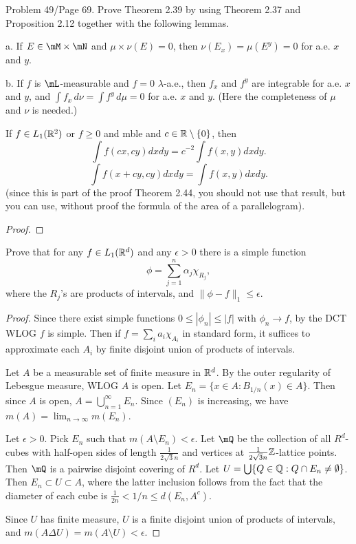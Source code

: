 \documentclass{article}
\begin{document}
 Problem 49/Page 69. Prove Theorem 2.39 by using Theorem 2.37 and Proposition 2.12 together with the following lemmas.

a. If $E \in \mM \times \mN$ and $\mu \times \nu(E) = 0$, then $\nu(E_x) = \mu(E^y) = 0$ for a.e. $x$ and $y$.

b. If $f$ is $\mL$-measurable and $f = 0$ $\lambda$-a.e., then $f_x$ and $f^y$ are integrable for a.e. $x$ and $y$, and $\int f_x \, d\nu = \int f^y \, d\mu = 0$ for a.e. $x$ and $y$. (Here the completeness of $\mu$ and $\nu$ is needed.)

 If $f \in L_1(\mathbb{R}^2)$ or $f \ge 0$ and mble and $c \in \mathbb{R} \setminus \{0\}$, then
$$ \int f (cx, cy) dx dy  =  c^{-2} \int f(x,y) dx dy.$$
$$\int f (x + cy, cy) dx dy  =  \int f(x,y) dx dy.$$
(since this is part of the proof Theorem 2.44, you should not use that result,
but you can use, without proof the formula of the area of a parallelogram).

\begin{proof}
\end{proof}

 Prove that for any $f \in L_1(\mathbb{R}^d)$ and any $\epsilon > 0$ there is a simple function
$$ \phi = \sum_{j=1}^n \alpha_j \chi_{R_j},$$
where the $R_j$'s are products of intervals, and $\|\phi - f\|_1 \le \epsilon$.
\begin{proof}
Since there exist simple functions $0 \le |\phi_n| \le |f|$ with $\phi_n \to f$, by the DCT WLOG $f$ is simple.  Then if $f = \sum_i a_i \chi_{A_i}$ in standard form, it suffices to approximate each $A_i$ by finite disjoint union of products of intervals.

Let $A$ be a measurable set of finite measure in $\mathbb{R}^d$.  By the outer regularity of Lebesgue measure, WLOG $A$ is open.  Let $E_n = \{x \in A : B_{1/n}(x) \in A\}$.  Then since $A$ is open, $A = \bigcup_{n=1}^\infty E_n$. Since $(E_n)$ is increasing, we have $m(A) = \lim_{n \to \infty} m(E_n)$.

Let $\epsilon > 0$.  Pick $E_n$ such that $m(A \setminus E_n) < \epsilon$.  Let $\mQ$ be the collection of all $R^d$-cubes with half-open sides of length $\frac 1 {2\sqrt 3 n}$ and vertices at $\frac 1 {2\sqrt 3 n} \mathbb{Z}$-lattice points. Then $\mQ$ is a pairwise disjoint covering of $R^d$. Let $U  = \bigcup \{Q \in \mathbb{Q} : Q \cap E_n \neq \emptyset\}$.  Then $E_n \subset U \subset A$, where the latter inclusion follows from the fact that the diameter of each cube is $\frac 1 {2n} < 1/n \le d(E_n, A^c)$.  

Since $U$ has finite measure, $U$ is a finite disjoint union of products of intervals, and $m(A \Delta U) = m(A \setminus U) < \epsilon$.
\end{proof}
\end{document}
